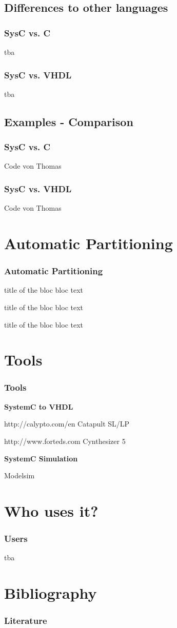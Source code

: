 \documentclass{beamer}
\begin{document}
\subsection{Differences to other languages}
\begin{frame}\frametitle{SysC vs. C} 
tba
\end{frame}
\begin{frame}\frametitle{SysC vs. VHDL} 
tba
\end{frame}

\subsection{Examples - Comparison}
\begin{frame}\frametitle{SysC vs. C} 
Code von Thomas
\end{frame}
\begin{frame}\frametitle{SysC vs. VHDL} 
Code von Thomas
\end{frame}


\section{Automatic Partitioning}
\begin{frame}\frametitle{Automatic Partitioning} 

\begin{block}{title of the bloc}
bloc text
\end{block}

\begin{exampleblock}{title of the bloc}
bloc text
\end{exampleblock}


\begin{alertblock}{title of the bloc}
bloc text
\end{alertblock}
\end{frame}

\section{Tools}
\begin{frame}\frametitle{Tools} 
\textbf{SystemC to VHDL}

http://calypto.com/en 	Catapult SL/LP

http://www.forteds.com	Cynthesizer 5 

\textbf{SystemC Simulation}

Modelsim
\end{frame}

\section{Who uses it?}
\begin{frame}\frametitle{Users} 
tba
\end{frame}
      
\section{Bibliography}
\nocite{haubelt2010digitale}
\begin{frame}\frametitle{Literature} 


\end{frame}
\end{document}
